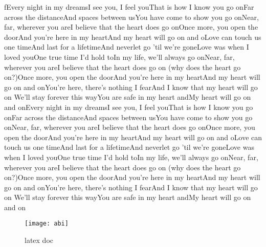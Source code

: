 \documentclass[12pt]{report}
\begin{document}
fEvery night in my dreamsI see you, I feel youThat is how I know you go onFar across the distanceAnd spaces between usYou have come to show you go onNear, far, wherever you areI believe that the heart does go onOnce more, you open the doorAnd you're here in my heartAnd my heart will go on and oLove can touch us one timeAnd last for a lifetimeAnd neverlet go 'til we're goneLove was when I loved youOne true time I'd hold toIn my life, we'll always go onNear, far, wherever you areI believe that the heart does go on (why does the heart go on?)Once more, you open the doorAnd you're here in my heartAnd my heart will go on and onYou're here, there's nothing I fearAnd I know that my heart will go on We'll stay forever this wayYou are safe in my heart andMy heart will go on and onEvery night in my dreamsI see you, I feel youThat is how I know you go onFar across the distanceAnd spaces between usYou have come to show you go onNear, far, wherever you areI believe that the heart does go onOnce more, you open the doorAnd you're here in my heartAnd my heart will go on and oLove can touch us one timeAnd last for a lifetimeAnd neverlet go 'til we're goneLove was when I loved youOne true time I'd hold toIn my life, we'll always go onNear, far, wherever you areI believe that the heart does go on (why does the heart go on?)Once more, you open the doorAnd you're here in my heartAnd my heart will go on and onYou're here, there's nothing I fearAnd I know that my heart will go on We'll stay forever this wayYou are safe in my heart andMy heart will go on and on

\begin{SCfigure}[0.1][h]
\texttt{[image: abi]}
\caption{latex doc}
\end{SCfigure}
\end{document}
